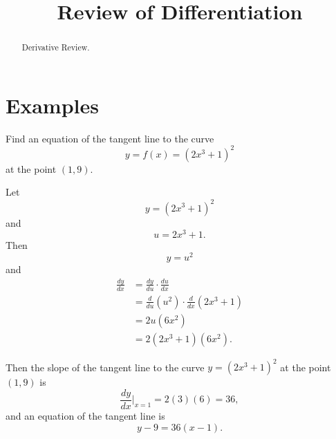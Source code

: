 \documentclass{ximera}
\title{Review of Differentiation}
\begin{document}
\begin{abstract}
Derivative Review.
\end{abstract}
\maketitle

\section*{Examples}

\begin{example}  \label{Ex:GDsdfFGff}
Find an equation of the tangent line to the curve
\[
  y = f(x) = \left( 2x^3 +1  \right)^2
\]
at the point $(1,9)$.

\begin{explanation}
Let 
\[
       y = \left( 2x^3 +1  \right)^2
\]
and 
\[
      u = 2x^3 + 1 .
\]
Then
\[
     y = u^2
\]
and
\begin{align*}
\frac{dy}{dx} &= \frac{dy}{du} \cdot \frac{du}{dx}  \\
                     &= \frac{d}{du} \left( u^2 \right)  \cdot \frac{d}{dx}\left(  2x^3 + 1 \right)  \\
                     &= 2u (6x^2)  \\
                     &= 2(2x^3+1)(6x^2) .
\end{align*}

Then the slope of the tangent line to the curve $y=(2x^3+1)^2$ at the point $(1,9)$ is 
\[
              \frac{dy}{dx}\Big|_{x=1} = 2(3)(6) = 36 ,
\]
and an equation of the tangent line is
\[
   y - 9 = 36(x-1) .
\]
\end{explanation}
\end{example}
\end{document}
